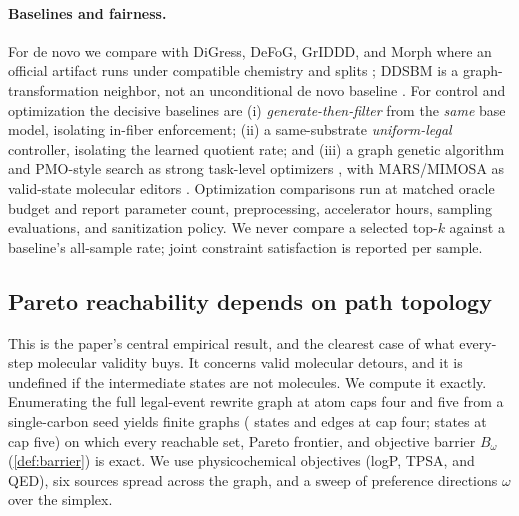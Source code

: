\documentclass{article}
\theoremstyle{definition}
\theoremstyle{remark}
\begin{document}
\paragraph{Baselines and fairness.}
For de novo we compare with DiGress, DeFoG, GrIDDD, and Morph where an official artifact runs under compatible chemistry and splits \citep{vignac2023digress,qin2025defog,ninniri2025griddd,franke2026morph}; DDSBM is a graph-transformation neighbor, not an unconditional de novo baseline \citep{kim2025ddsbm}. For control and optimization the decisive baselines are (i) \emph{generate-then-filter} from the \emph{same} base model, isolating in-fiber enforcement; (ii) a same-substrate \emph{uniform-legal} controller, isolating the learned quotient rate; and (iii) a graph genetic algorithm and PMO-style search as strong task-level optimizers \citep{jensen2019graphga,gao2022pmo}, with MARS/MIMOSA as valid-state molecular editors \citep{xie2021mars,fu2021mimosa}. Optimization comparisons run at matched oracle budget and report parameter count, preprocessing, accelerator hours, sampling evaluations, and sanitization policy. We never compare a selected top-$k$ against a baseline's all-sample rate; joint constraint satisfaction is reported per sample.

\subsection{Pareto reachability depends on path topology}
\label{sec:mechanism}

This is the paper's central empirical result, and the clearest case of what every-step molecular validity buys. It concerns valid molecular detours, and it is undefined if the intermediate states are not molecules. We compute it exactly. Enumerating the full legal-event rewrite graph at atom caps four and five from a single-carbon seed yields finite graphs (\ReachStatesCapFour{} states and \ReachEdgesCapFour{} edges at cap four; \ReachStatesCapFive{} states at cap five) on which every reachable set, Pareto frontier, and objective barrier $B_\omega$ (\cref{def:barrier}) is exact. We use physicochemical objectives (logP, TPSA, and QED), six sources spread across the graph, and a sweep of preference directions $\omega$ over the simplex.
\end{document}
